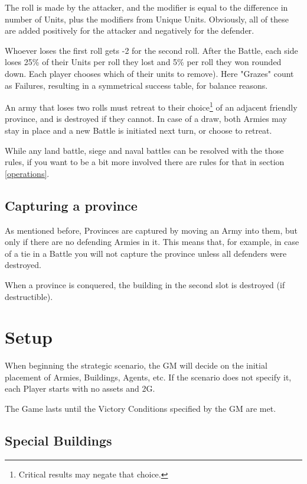 The roll is made by the attacker, and the modifier is equal to the difference in number of Units, plus the modifiers from Unique Units. Obviously, all of these are added positively for the attacker and negatively for the defender.

Whoever loses the first roll gets -2 for the second roll. After the Battle, each side loses 25\% of their Units per roll they lost and 5\% per roll they won rounded down. Each player chooses which of their units to remove). Here "Grazes" count as Failures, resulting in a symmetrical success table, for balance reasons.

An army that loses two rolls must retreat to their choice\footnote{Critical results may negate that choice.} of an adjacent friendly province, and is destroyed if they cannot. In case of a draw, both Armies may stay in place and a new Battle is initiated next turn, or choose to retreat.

While any land battle, siege and naval battles can be resolved with the those rules, if you want to be a bit more involved there are rules for that in section \ref{operations}.


\subsection{Capturing a province} 

As mentioned before, Provinces are captured by moving an Army into them, but only if there are no defending Armies in it. This means that, for example, in case of a tie in a Battle you will not capture the province unless all defenders were destroyed.

When a province is conquered, the building in the second slot is destroyed (if destructible).


\section{Setup}

When beginning the strategic scenario, the GM will decide on the initial placement of Armies, Buildings, Agents, etc. If the scenario does not specify it, each Player starts with no assets and 2G.

The Game lasts until the Victory Conditions specified by the GM are met.


\subsection{Special Buildings} 

